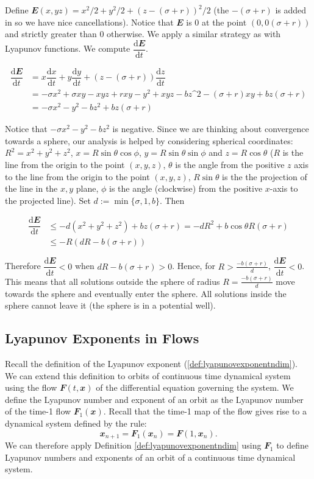 \documentclass[
  a4paper,
  oneside,
  final]{krantz}
\renewcommand{\d}{\mathrm{d}}
\renewcommand{\v}[1]{{\mathbfit{#1}}}
\newcommand{\der}[2]{\dfrac{\d #1}{\d #2}}
\theoremstyle{definition}
\theoremstyle{definition}
\theoremstyle{definition}
\theoremstyle{definition}
\theoremstyle{remark}
\begin{document}
Define \(\v{E}(x,yz) = x^2/2 + y^2/2 + ( z - (\sigma + r))^2/2\) (the
\(-(\sigma +r)\) is added in so we have nice cancellations). Notice that
\(\v{E}\) is \(0\) at the point \((0,0 (\sigma+r))\) and strictly greater than
\(0\) otherwise. We apply a similar strategy as with Lyapunov functions.
We compute \(\der{\v{E}}{t}\).

\begin{align*} 
\der{\v{E}}{t} &= x \der{x}{t} + y \der{y}{t} +
\left(z-(\sigma + r)\right) \der{z}{t}\\ &= - \sigma x^2 +
\sigma xy -xyz + rxy - y^2 + xyz - bz\^2 - (\sigma + r)xy +bz(\sigma
+r)\\ &= -\sigma x^2 - y^2 -bz^2 + bz(\sigma + r) 
\end{align*}

Notice that \(-\sigma x^2 - y^2 -bz^2\) is negative. Since we are thinking
about convergence towards a sphere, our analysis is helped by
considering spherical coordinates: \(R^2 = x^2 + y^2 + z^2\),
\(x = R \sin \theta \cos \phi\), \(y= R \sin \theta \sin \phi\) and
\(z = R \cos \theta\) (\(R\) is the line from the origin to the point
\((x,y,z)\), \(\theta\) is the angle from the positive \(z\) axis to the line
from the origin to the point \((x,y,z)\), \(R \sin \theta\) is the the
projection of the line in the \(x,y\) plane, \(\phi\) is the angle
(clockwise) from the positive \(x\)-axis to the projected line). Set
\(d := \min \{\sigma, 1, b\}\). Then

\begin{align*}
\der{\v{E}}{t} &\le -d(x^2 + y^2 + z^2) + bz (\sigma + r) =
-dR^2 +b \cos\theta R (\sigma +r)\\
& \le -R (dR - b(\sigma + r))
\end{align*}

Therefore \(\der{\v{E}}{t}<0\) when \(dR -b (\sigma + r) >0\). Hence, for
\(R> \frac{-b(\sigma + r)}{d}\), \(\der{\v{E}}{t}<0\). This means that all
solutions outside the sphere of radius \(R = \frac{-b(\sigma + r)}{d}\)
move towards the sphere and eventually enter the sphere. All solutions
inside the sphere cannot leave it (the sphere is in a potential well).

\hypertarget{Lyapunov-exponent-flows}{%
\subsection{Lyapunov Exponents in Flows}\label{Lyapunov-exponent-flows}}

Recall the definition of the Lyapunov exponent
(\ref{def:lyapunovexponentndim}). We can extend this definition to
orbits of continuous time dynamical system using the flow
\(\v{F}(t, \v{x})\) of the differential equation governing the system. We
define the Lyapunov number and exponent of an orbit as the Lyapunov
number of the time-1 flow \(\v{F}_{1}(\v{x})\). Recall that the time-1 map
of the flow gives rise to a dynamical system defined by the rule:
\[\v{x}_{n+1} = \v{F}_{1}(\v{x}_{n}) = \v{F}(1, \v{x}_{n}).\] We can
therefore apply Definition \ref{def:lyapunovexponentndim} using
\(\v{F}_{1}\) to define Lyapunov numbers and exponents of an orbit of a
continuous time dynamical system.
\end{document}
